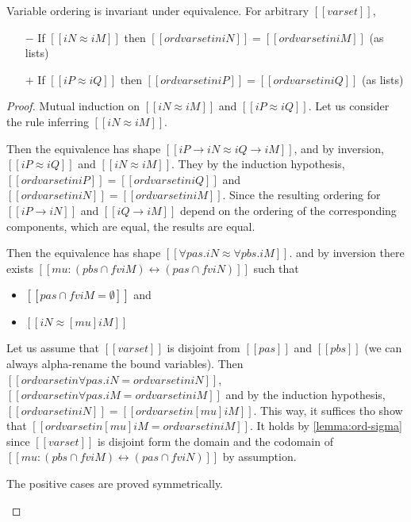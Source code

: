 \begin{lemma}
  \label{lemma:ord-completeness}
  Variable ordering is invariant under equivalence. For arbitrary $[[varset]]$,
   \begin{itemize}
  \item[$-$] If $[[iN ≈ iM]]$ then $[[ord varset in iN]] = [[ord varset in iM]]$ (as lists)
  \item[$+$] If $[[iP ≈ iQ]]$ then $[[ord varset in iP]] = [[ord varset in iQ]]$ (as lists)
  \end{itemize}
\end{lemma}
\begin{proof}
  Mutual induction on $[[iN ≈ iM]]$ and $[[iP ≈ iQ]]$.
  Let us consider the rule inferring $[[iN ≈ iM]]$. 
  \begin{caseof}
    \item {}
    \item {}
    \item {}
      Then the equivalence has shape $[[iP → iN ≈ iQ → iM]]$,
      and by inversion, $[[iP ≈ iQ]]$ and $[[iN ≈ iM]]$.
      They by the induction hypothesis,
      $[[ord varset in iP]] = [[ord varset in iQ]]$ 
      and $[[ord varset in iN]] = [[ord varset in iM]]$.
      Since the resulting ordering for $[[iP → iN]]$ and $[[iQ → iM]]$
      depend on the ordering of the corresponding components, 
      which are equal, the results are equal.
    \item {}
      Then the equivalence has shape $[[∀pas.iN ≈ ∀pbs.iM]]$.
      and by inversion there exists 
      $[[mu : ({pbs} ∩ fv iM) ↔ ({pas} ∩ fv iN)]]$ such that
      \begin{itemize}
        \item $[[{pas} ∩ fv iM = ∅]]$ and 
        \item $[[iN ≈ [mu] iM]]$
      \end{itemize}

      Let us assume that $[[varset]]$ is disjoint from 
      $[[pas]]$ and $[[pbs]]$ 
      (we can always alpha-rename the bound variables).
      Then $[[ord varset in ∀pas.iN = ord varset in iN]]$, 
      $[[ord varset in ∀pas.iM = ord varset in iM]]$
      and by the induction hypothesis,
      $[[ord varset in iN]] = [[ord varset in [mu]iM]]$.
      This way, it suffices tho show  that 
      $[[ord varset in [mu]iM = ord varset in iM]]$.
      It holds by \cref{lemma:ord-sigma} since
      $[[varset]]$ is disjoint form 
      the domain and the codomain of 
      $[[mu : ({pbs} ∩ fv iM) ↔ ({pas} ∩ fv iN)]]$ 
      by assumption.

    \item The positive cases are proved symmetrically.
  \end{caseof}
\end{proof}
